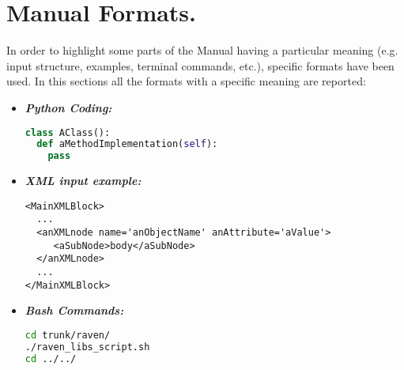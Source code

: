 \section{Manual Formats.}
In order to highlight some parts of the Manual having a particular meaning (e.g. input structure, examples, terminal commands, etc.), specific formats have been used. In this sections all the formats with a specific meaning are reported:
\begin{itemize}
\item \textbf{\textit{Python Coding:}}
\begin{lstlisting}[language=python]
class AClass():
  def aMethodImplementation(self):
    pass
\end{lstlisting}
\item \textbf{\textit{XML input example:}}
\begin{lstlisting}[style=XML,morekeywords={anAttribute}]
<MainXMLBlock>
  ...
  <anXMLnode name='anObjectName' anAttribute='aValue'>
     <aSubNode>body</aSubNode>
  </anXMLnode>
  ...
</MainXMLBlock>
\end{lstlisting}
\item \textbf{\textit{Bash Commands:}}
\begin{lstlisting}[language=bash]
cd trunk/raven/
./raven_libs_script.sh
cd ../../
\end{lstlisting}
\end{itemize}
 
